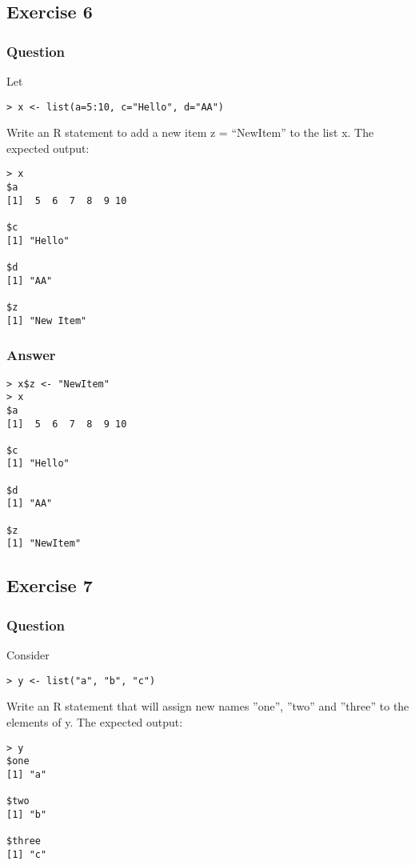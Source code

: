 \documentclass[11pt]{article}
\begin{document}
\subsection{Exercise 6}
\label{sec:orgeb00b28}
\subsubsection{Question}
\label{sec:org29a7130}
Let
\begin{verbatim}
> x <- list(a=5:10, c="Hello", d="AA")
\end{verbatim}

Write an R statement to add a new item z = “NewItem” to the list x.  The expected output:
\begin{verbatim}
> x
$a
[1]  5  6  7  8  9 10

$c
[1] "Hello"

$d
[1] "AA"

$z
[1] "New Item"
\end{verbatim}

\subsubsection{Answer}
\label{sec:org74cfa45}
\begin{verbatim}
> x$z <- "NewItem"
> x
$a
[1]  5  6  7  8  9 10

$c
[1] "Hello"

$d
[1] "AA"

$z
[1] "NewItem"
\end{verbatim}

\subsection{Exercise 7}
\label{sec:org28a396f}
\subsubsection{Question}
\label{sec:org99bc27a}
Consider
\begin{verbatim}
> y <- list("a", "b", "c")
\end{verbatim}

Write an R statement that will assign new names ”one”, ”two” and ”three” to the elements of y.  The expected output:
\begin{verbatim}
> y
$one
[1] "a"

$two
[1] "b"

$three
[1] "c"
\end{verbatim}
\end{document}
